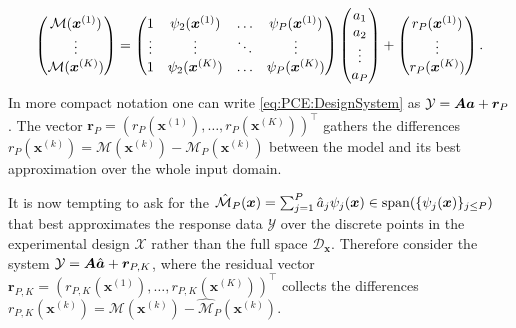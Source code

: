 \begin{equation} \label{eq:PCE:DesignSystem}
  \begin{pmatrix}
    \mathcal{M}(\bm{x}^{(1)}) \\
    \vdots \\
    \mathcal{M}(\bm{x}^{(K)}) \\
  \end{pmatrix} =
  \begin{pmatrix}
    1 & \psi_{2}(\bm{x}^{(1)}) & \ldots & \psi_{P}(\bm{x}^{(1)}) \\
    \vdots & \vdots & \ddots & \vdots \\
    1 & \psi_{2}(\bm{x}^{(K)}) & \ldots & \psi_{P}(\bm{x}^{(K)}) \\
  \end{pmatrix}
  \begin{pmatrix}
    a_1 \\
    a_2 \\
    \vdots \\
    a_P \\
  \end{pmatrix} +
  \begin{pmatrix}
    r_P(\bm{x}^{(1)}) \\
    \vdots \\
    r_P(\bm{x}^{(K)}) \\
  \end{pmatrix}.
\end{equation}
In more compact notation one can write \cref{eq:PCE:DesignSystem} as \(\mathcal{Y} = \bm{A} \bm{a} + \bm{r}_P\).
The vector \(\bm{r}_P = (r_P(\bm{x}^{(1)}),\ldots,r_P(\bm{x}^{(K)}))^\top\) gathers the differences
\(r_P(\bm{x}^{(k)}) = \mathcal{M}(\bm{x}^{(k)}) - \mathcal{M}_P(\bm{x}^{(k)})\) between the model and its best approximation over the whole input domain.
\par %
It is now tempting to ask for the \(\hat{\mathcal{M}}_P(\bm{x}) = \sum_{j=1}^P \hat{a}_{j} \psi_{j}(\bm{x}) \in \mathrm{span}(\{\psi_{j}(\bm{x})\}_{j \leq P})\)
that best approximates the response data \(\mathcal{Y}\) over the discrete points in the experimental design \(\mathcal{X}\) rather than the full space \(\mathcal{D}_{\bm{x}}\).
Therefore consider the system \(\mathcal{Y} = \bm{A} \hat{\bm{a}} + \bm{r}_{P,K}\),
where the residual vector \(\bm{r}_{P,K} = (r_{P,K}(\bm{x}^{(1)}),\ldots,r_{P,K}(\bm{x}^{(K)}))^\top\)
collects the differences \(r_{P,K}(\bm{x}^{(k)}) = \mathcal{M}(\bm{x}^{(k)}) - \hat{\mathcal{M}}_P(\bm{x}^{(k)})\).
